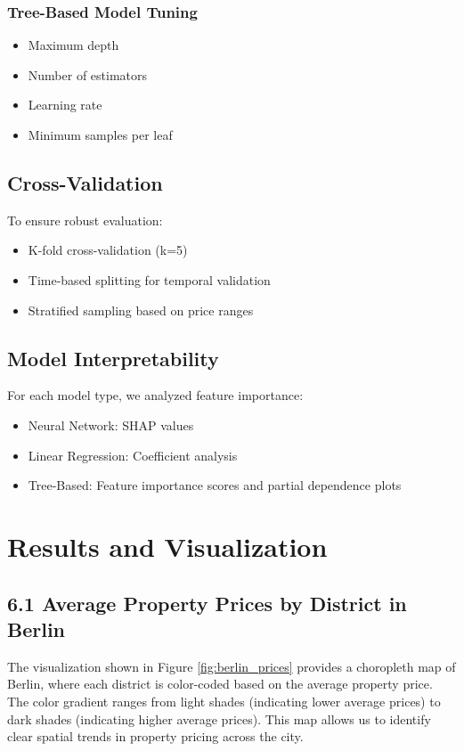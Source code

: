 \documentclass[twocolumn]{article}
\begin{document}
\subsubsection{Tree-Based Model Tuning}
\begin{itemize}
    \item Maximum depth
    \item Number of estimators
    \item Learning rate
    \item Minimum samples per leaf
\end{itemize}

\subsection{Cross-Validation}
To ensure robust evaluation:
\begin{itemize}
    \item K-fold cross-validation (k=5)
    \item Time-based splitting for temporal validation
    \item Stratified sampling based on price ranges
\end{itemize}

\subsection{Model Interpretability}
For each model type, we analyzed feature importance:
\begin{itemize}
    \item Neural Network: SHAP values
    \item Linear Regression: Coefficient analysis
    \item Tree-Based: Feature importance scores and partial dependence plots
\end{itemize}

\section{Results and Visualization}
\subsection*{6.1 Average Property Prices by District in Berlin}

The visualization shown in Figure \ref{fig:berlin_prices} provides a choropleth map of Berlin, where each district is color-coded based on the average property price. The color gradient ranges from light shades (indicating lower average prices) to dark shades (indicating higher average prices). This map allows us to identify clear spatial trends in property pricing across the city.
\end{document}
